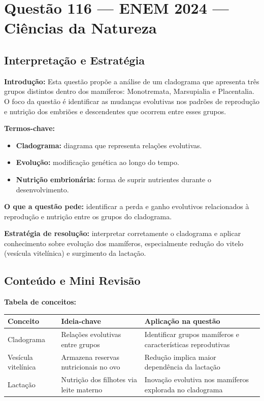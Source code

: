 \documentclass{article}
\begin{document}
\section*{Questão 116 — ENEM 2024 — Ciências da Natureza}

\subsection*{Interpretação e Estratégia}

\textbf{Introdução:} Esta questão propõe a análise de um cladograma que apresenta três grupos distintos dentro dos mamíferos: Monotremata, Marsupialia e Placentalia. O foco da questão é identificar as mudanças evolutivas nos padrões de reprodução e nutrição dos embriões e descendentes que ocorrem entre esses grupos.

\textbf{Termos-chave:}
\begin{itemize}
  \item \textbf{Cladograma:} diagrama que representa relações evolutivas.
  \item \textbf{Evolução:} modificação genética ao longo do tempo.
  \item \textbf{Nutrição embrionária:} forma de suprir nutrientes durante o desenvolvimento.
\end{itemize}

\textbf{O que a questão pede:} identificar a perda e ganho evolutivos relacionados à reprodução e nutrição entre os grupos do cladograma.

\textbf{Estratégia de resolução:} interpretar corretamente o cladograma e aplicar conhecimento sobre evolução dos mamíferos, especialmente redução do vitelo (vesícula vitelínica) e surgimento da lactação.

\subsection*{Conteúdo e Mini Revisão}

\textbf{Tabela de conceitos:}

\begin{tabular}{p{4cm}p{6cm}p{6cm}}
\hline
\textbf{Conceito} & \textbf{Ideia-chave} & \textbf{Aplicação na questão} \\
\hline
Cladograma & Relações evolutivas entre grupos & Identificar grupos mamíferos e características reprodutivas \\
Vesícula vitelínica & Armazena reservas nutricionais no ovo & Redução implica maior dependência da lactação \\
Lactação & Nutrição dos filhotes via leite materno & Inovação evolutiva nos mamíferos explorada no cladograma \\
\hline
\end{tabular}
\end{document}
